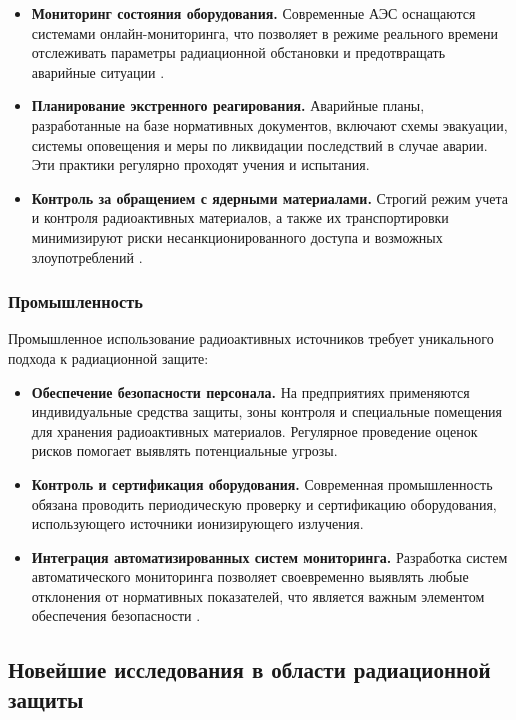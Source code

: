\documentclass[a4paper, 14pt]{extarticle}
\begin{document}
\begin{itemize}
    \item \textbf{Мониторинг состояния оборудования.} Современные АЭС оснащаются системами онлайн-мониторинга, что позволяет в режиме реального времени отслеживать параметры радиационной обстановки и предотвращать аварийные ситуации \cite{15}.

    \item \textbf{Планирование экстренного реагирования.} Аварийные планы, разработанные на базе нормативных документов, включают схемы эвакуации, системы оповещения и меры по ликвидации последствий в случае аварии. Эти практики регулярно проходят учения и испытания.

    \item \textbf{Контроль за обращением с ядерными материалами.} Строгий режим учета и контроля радиоактивных материалов, а также их транспортировки минимизируют риски несанкционированного доступа и возможных злоупотреблений \cite{15}.
\end{itemize}

\subsubsection{Промышленность}

Промышленное использование радиоактивных источников требует уникального подхода к радиационной защите:

\begin{itemize}
    \item \textbf{Обеспечение безопасности персонала.} На предприятиях применяются индивидуальные средства защиты, зоны контроля и специальные помещения для хранения радиоактивных материалов. Регулярное проведение оценок рисков помогает выявлять потенциальные угрозы.

    \item \textbf{Контроль и сертификация оборудования.} Современная промышленность обязана проводить периодическую проверку и сертификацию оборудования, использующего источники ионизирующего излучения.

    \item \textbf{Интеграция автоматизированных систем мониторинга.} Разработка систем автоматического мониторинга позволяет своевременно выявлять любые отклонения от нормативных показателей, что является важным элементом обеспечения безопасности \cite{12}.
\end{itemize}

\subsection{Новейшие исследования в области радиационной защиты}
\end{document}
